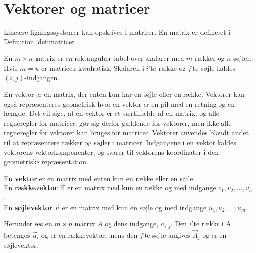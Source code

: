 \section{Vektorer og matricer}

Lineære ligningssystemer kan opskrives i matricer. 
En matrix er defineret i Definition \ref{def:matricer}.

\begin{defn}[Matrix]
En $m \times n$ matrix er en rektangulær tabel over skalarer med $m$ rækker og $n$ søjler. 
Hvis $m=n$ er matricen kvadratisk. 
Skalaren i $i$'te række og $j$'te søjle kaldes $(i,j)$-indgangen.
\label{def:matricer}
\end{defn}

En vektor er en matrix, der enten kun har en søjle eller en række. Vektorer kan også repræsenteres geometrisk hvor en vektor er en pil med en retning og en længde.
Det vil sige, at en vektor er et særtilfælde af en matrix, og alle regneregler for matricer, gør sig derfor gældende for vektorer, men ikke alle regneregler for vektorer kan bruges for matricer.
Vektorer anvendes blandt andet til at repræsentere rækker og søjler i matricer. 
Indgangene i en vektor kaldes vektorens vektorkomponenter, og svarer til vektorens koordinater i den geometriske repræsentation.

\begin{defn}[Vektor]
En \textbf{vektor} er en matrix med enten kun en række eller en søjle. \\
En \textbf{rækkevektor} $\vec{v}$ er en matrix med kun en række og med indgange $v_1,v_2,...,v_n$.\\
En \textbf{søjlevektor} $\vec{u}$ er en matrix med kun en søjle og med indgange $u_1,u_2,...,u_m$.\\
\end{defn}

Herunder ses en $m \times n$ matrix $A$ og dens indgange, $a_{i,j}$. Den $i$'te række i A betenges $\vec{a}_i$ og er en rækkevektor, mens den $j$'te søjle angives $\vec{A}_j$ og er en søjlevektor.

